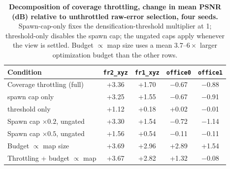 \begin{table}[tbp]
\centering
\footnotesize\setlength{\tabcolsep}{2pt}
\begin{tabular}{lcccc}
\toprule
\textbf{Condition} & \texttt{fr2\_xyz} & \texttt{fr1\_xyz} & \texttt{office0} & \texttt{office1} \\
\midrule
Coverage throttling (full) & +3.36 & +1.70 & $-$0.67 & $-$0.88 \\
\quad spawn cap only & +3.25 & +1.55 & $-$0.67 & $-$0.91 \\
\quad threshold only & +1.12 & +0.18 & +0.02 & $-$0.01 \\
Spawn cap $\times0.2$, ungated & +3.30 & +1.54 & $-$0.72 & $-$1.14 \\
Spawn cap $\times0.5$, ungated & +1.56 & +0.54 & $-$0.11 & $-$0.11 \\
\midrule
Budget $\propto$ map size & +3.69 & +2.96 & +2.89 & +1.54 \\
Throttling + budget $\propto$ map & +3.67 & +2.82 & +1.32 & $-$0.08 \\
\bottomrule
\end{tabular}
\caption{\textbf{Decomposition of coverage throttling, change in mean PSNR (dB) relative to unthrottled raw-error selection, four seeds.} Spawn-cap-only fixes the densification-threshold multiplier at 1; threshold-only disables the spawn cap; the ungated caps apply whenever the view is settled. Budget $\propto$ map size uses a mean $3.7$--$6\times$ larger optimization budget than the other rows.}
\label{tab:ablation}
\end{table}
